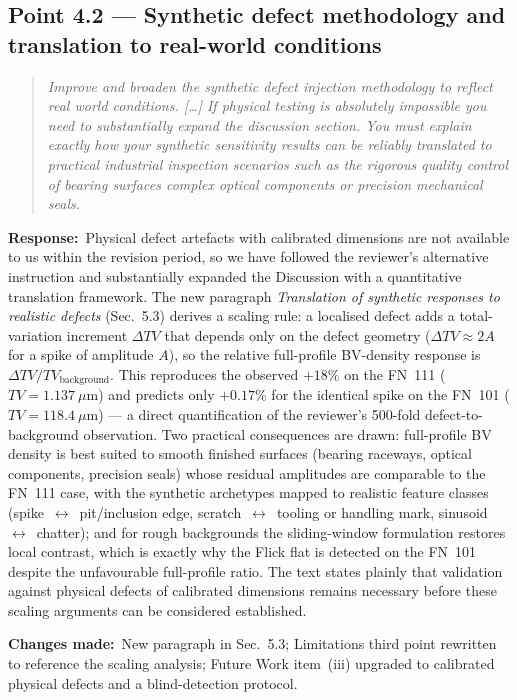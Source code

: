 \documentclass[11pt,a4paper]{article}
\newenvironment{reviewercomment}%
{\par\medskip\noindent\begin{quotation}\itshape\color{black!70}}%
{\end{quotation}\medskip}
\newcommand{\response}{\par\noindent\textbf{Response:}\ }
\newcommand{\changes}{\par\noindent\textbf{Changes made:}\ }
\begin{document}
\subsection*{Point 4.2 --- Synthetic defect methodology and translation to real-world conditions}
\begin{reviewercomment}
Improve and broaden the synthetic defect injection methodology to reflect real world conditions. [\ldots] If physical testing is absolutely impossible you need to substantially expand the discussion section. You must explain exactly how your synthetic sensitivity results can be reliably translated to practical industrial inspection scenarios such as the rigorous quality control of bearing surfaces complex optical components or precision mechanical seals.
\end{reviewercomment}
\response Physical defect artefacts with calibrated dimensions are not available to us within the revision period, so we have followed the reviewer's alternative instruction and substantially expanded the Discussion with a quantitative translation framework. The new paragraph \emph{Translation of synthetic responses to realistic defects} (Sec.~5.3) derives a scaling rule: a localised defect adds a total-variation increment $\Delta TV$ that depends only on the defect geometry ($\Delta TV \approx 2A$ for a spike of amplitude $A$), so the relative full-profile BV-density response is $\Delta TV/TV_{\mathrm{background}}$. This reproduces the observed $+18\%$ on the FN~111 ($TV = 1.137~\mu$m) and predicts only $+0.17\%$ for the identical spike on the FN~101 ($TV = 118.4~\mu$m) --- a direct quantification of the reviewer's 500-fold defect-to-background observation. Two practical consequences are drawn: full-profile BV density is best suited to smooth finished surfaces (bearing raceways, optical components, precision seals) whose residual amplitudes are comparable to the FN~111 case, with the synthetic archetypes mapped to realistic feature classes (spike~$\leftrightarrow$~pit/inclusion edge, scratch~$\leftrightarrow$~tooling or handling mark, sinusoid~$\leftrightarrow$~chatter); and for rough backgrounds the sliding-window formulation restores local contrast, which is exactly why the Flick flat is detected on the FN~101 despite the unfavourable full-profile ratio. The text states plainly that validation against physical defects of calibrated dimensions remains necessary before these scaling arguments can be considered established.
\changes New paragraph in Sec.~5.3; Limitations third point rewritten to reference the scaling analysis; Future Work item~(iii) upgraded to calibrated physical defects and a blind-detection protocol.
\end{document}
